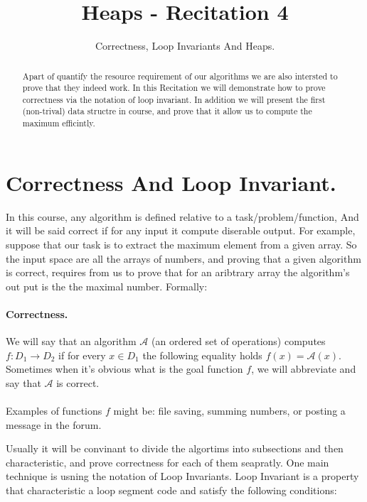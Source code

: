 \title{Heaps - Recitation 4} 
\author{Correctness, Loop Invariants And Heaps.}


\begin{abstract}
  Apart of quantify the resource requirement of our algorithms we are also intersted to prove that they indeed work. In this Recitation we will demonstrate how to prove correctness via the notation of loop invariant. In addition we will present the first (non-trival) data structre in course, and prove that it allow us to compute the maximum efficintly.     
   
\end{abstract}


\section{Correctness And Loop Invariant.}
In this course, any algorithm is defined relative to a task/problem/function, And it will be said correct if for any input it compute diserable output. For example, suppose that our task is to extract the maximum element from a given array.
So the input space are all the arrays of numbers, and proving that a given algorithm is correct, requires from us to prove that for an aribtrary array the algorithm's out put is the the maximal number. Formally:  

\begin{tcolorbox}
\paragraph{Correctness.} We will say that an algorithm \( \mathcal{A}\) (an ordered set of operations) computes \( f:D_1 \rightarrow D_2 \) if for every \(x \in D_1\) the following equality holds \(f(x) = \mathcal{A}(x)\). Sometimes when it's obvious what is the goal function \(f\), we will abbreviate and say that \( \mathcal{A}\) is correct.       
\end{tcolorbox}
\paragraph{}
Examples of functions \(f\) might be: file saving, summing numbers, or posting a message in the forum.  

Usually it will be convinant to divide the algortims into subsections and then characteristic, and prove correctness for each of them seapratly. One main technique is usning the notation of Loop Invariants. Loop Invariant is a property that characteristic a loop segment code  and satisfy the following conditions: 


